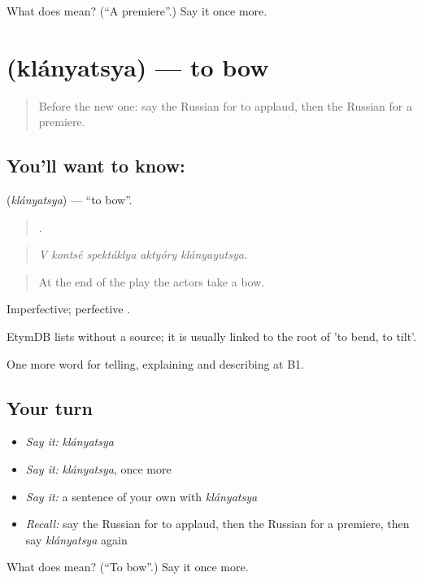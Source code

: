 \begin{tcolorbox}[breakable,colback=teal!4,colframe=teal!35!black,title={Before you move on}]
What does  mean? (\textquotedblleft{}A premiere\textquotedblright{}.) Say it once more.
\end{tcolorbox}
\section[\texorpdfstring{\ru{кланяться} (klányatsya)}{кланяться (klányatsya)}]{ (klányatsya) — to bow}

\label{lesson:RU-C519-klanyatsya}



\begin{quote}
Before the new one: say the Russian for to applaud, then the Russian for a premiere.
\end{quote}

\subsection*{You'll want to know: }
\textbf{} (\emph{klányatsya}) — \textquotedblleft{}to bow\textquotedblright{}.

\begin{quote}
    .
\end{quote}

\begin{quote}
\emph{V kontsé spektáklya aktyóry klányayutsya.}
\end{quote}

\begin{quote}
At the end of the play the actors take a bow.
\end{quote}

Imperfective; perfective .

\begin{cousinweb}
EtymDB lists \emph{} without a source; it is usually linked to the root of \emph{} 'to bend, to tilt'.
\end{cousinweb}

\begin{grammarlens}[title={What you've built}]
One more word for telling, explaining and describing at B1.
\end{grammarlens}

\subsection*{Your turn}
\begin{itemize}
\raggedright
  \item \emph{Say it:} \emph{klányatsya}
  \item \emph{Say it:} \emph{klányatsya}, once more
  \item \emph{Say it:} a sentence of your own with \emph{klányatsya}
  \item \emph{Recall:} say the Russian for to applaud, then the Russian for a premiere, then say \emph{klányatsya} again
\end{itemize}

\begin{tcolorbox}[breakable,colback=teal!4,colframe=teal!35!black,title={Before you move on}]
What does  mean? (\textquotedblleft{}To bow\textquotedblright{}.) Say it once more.
\end{tcolorbox}

